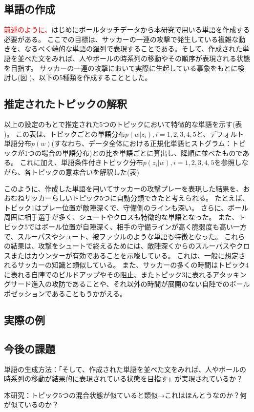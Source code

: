 
\subsection{単語の作成}
\textcolor{red}{前述のように、}はじめにボールタッチデータから本研究で用いる単語を作成する必要がある。
ここでの目標は、サッカーの一連の攻撃で発生している複雑な動きを、なるべく端的な単語の羅列で表現することである。そして、作成された単語を並べた文をみれば、人やボールの時系列の移動やその順序が表現される状態を目指す。
サッカーの一連の攻撃において実際に生起している事象をもとに検討し(図 )、以下の5種類を作成することとした。

\subsection{推定されたトピックの解釈}
以上の設定のもとで推定された5つのトピックにおいて特徴的な単語を示す(表 )。
この表は、トピックごとの単語分布$p(w|z_i),i={1,2,3,4,5}$と、デフォルト単語分布$p(w)$(すなわち、データ全体における正規化単語ヒストグラム：トピックが1つの場合の単語分布)との比を単語ごとに算出し、降順に並べたものである。
これに加え、単語条件付きトピック分布$p(z_i|w),i={1,2,3,4,5}$を参照しながら、各トピックの意味合いを解釈した(表)

このように、作成した単語を用いてサッカーの攻撃プレーを表現した結果を、おおむねサッカーらしいトピック5つに自動分類できたと考えられる。
たとえば、トピック1はプレー位置が敵陣深くで、守備側のラインも深い。
さらに、ボール周囲に相手選手が多く、シュートやクロスも特徴的な単語となった。
また、トピック5ではボール位置が自陣深く、相手の守備ラインが高く脆弱度も高い一方で、スルーパスやシュート、被ファウルのような単語も特徴となった。
これらの結果は、攻撃をシュートで終えるためには、敵陣深くからのスルーパスやクロスまたはカウンターが有効であることを示唆している。
これは、一般に想定されるサッカーの知識と類似している。
また、サッカーの多くの時間はトピック4に表れる自陣でのビルドアップやその阻止、またトピック3に表れるアタッキングサード進入の攻防であることや、それ以外の時間が展開のない自陣でのボールポゼッションであることもうかがえる。

\subsection{実際の例}

\subsection{今後の課題}

単語の生成方法：「そして、作成された単語を並べた文をみれば、人やボールの時系列の移動が結果的に表現されている状態を目指す」が実現されているか？

本研究：トピック5つの混合状態が似ていると類似→これはほんとうなのか？何が似ているのか？

